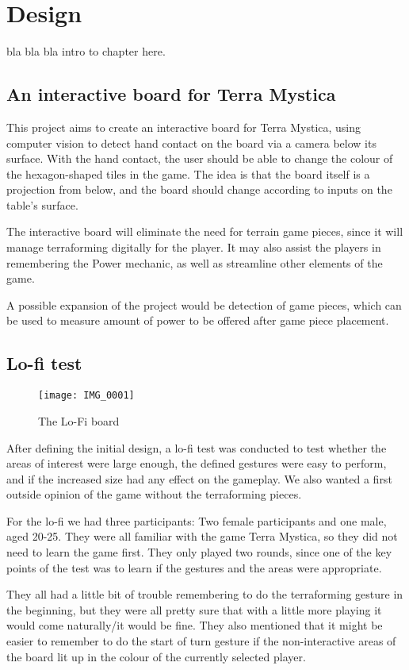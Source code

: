 \chapter{Design}\label{ch:design}
bla bla bla intro to chapter here.

\section{An interactive board for Terra Mystica}
This project aims to create an interactive board for Terra Mystica, using computer vision to detect hand contact on the board via a camera below its surface. With the hand contact, the user should be able to change the colour of the hexagon-shaped tiles in the game. The idea is that the board itself is a projection from below, and the board should change according to inputs on the table's surface.

The interactive board will eliminate the need for terrain game pieces, since it will manage terraforming digitally for the player. It may also assist the players in remembering the Power mechanic, as well as streamline other elements of the game.

A possible expansion of the project would be detection of game pieces, which can be used to measure amount of power to be offered after game piece placement.

\section{Lo-fi test}
\begin{figure}
\centering
\texttt{[image: IMG\_0001]}
\caption{The Lo-Fi board}
\end{figure}

After defining the initial design, a lo-fi test was conducted to test whether the areas of interest were large enough, the defined gestures were easy to perform, and if the increased size had any effect on the gameplay. We also wanted a first outside opinion of the game without the terraforming pieces. 

For the lo-fi we had three participants: Two female participants and one male, aged 20-25. 
They were all familiar with the game Terra Mystica, so they did not need to learn the game first. They only played two rounds, since one of the key points of the test was to learn if the gestures and the areas were appropriate. 

They all had a little bit of trouble remembering to do the terraforming gesture in the beginning, but they were all pretty sure that with a little more playing it would come naturally/it would be fine. They also mentioned that it might be easier to remember to do the start of turn gesture if the non-interactive areas of the board lit up in the colour of the currently selected player. 


